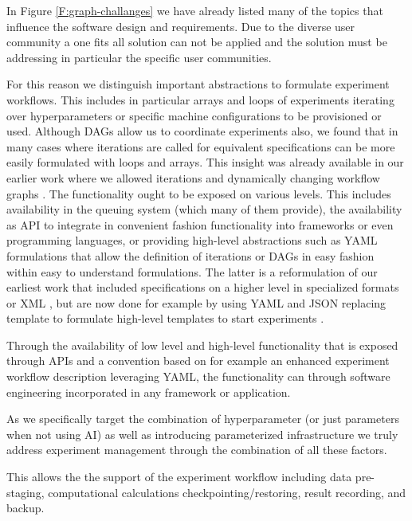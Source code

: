 \documentclass[utf8]{FrontiersinVancouver} %
\begin{document}
In Figure \ref{F:graph-challanges} we have already listed many of the topics that influence the software design and requirements. Due to the diverse user community a one fits all solution can not be applied and the solution must be addressing in particular the specific user communities.

For this reason we distinguish important abstractions to formulate experiment workflows. This includes in particular arrays and loops of experiments iterating over hyperparameters or specific machine configurations to be provisioned or used. 
Although DAGs allow us to coordinate experiments also, we found that in many cases where iterations are called for equivalent specifications can be more easily formulated with loops and arrays. This insight was already available in our earlier work where we allowed iterations and dynamically changing workflow graphs \citep{las07-workflow}. The functionality ought to be exposed on various levels. This includes availability in the queuing system (which many of them provide), the availability as API to integrate in convenient fashion functionality into frameworks or even programming languages, or providing high-level abstractions such as YAML formulations that allow the definition of iterations or DAGs in easy fashion within easy to understand formulations. The latter is a reformulation of our earliest work that included specifications on a higher level in specialized formats \citep{las-96-ecwmf}  or XML \citep{las07-workflow}, but are now done for example by using YAML and JSON replacing template to formulate high-level templates to start experiments \citep{cloudmesh-cc,cloudmask-ee}.

Through the availability of low level and high-level functionality that is exposed through APIs and a convention based on for example an enhanced experiment workflow description leveraging YAML, the functionality can through software engineering incorporated in any framework or application. 

As we specifically target the combination of hyperparameter (or just parameters when not using AI) as well as introducing parameterized infrastructure we truly address experiment management through the combination of all these factors.

This allows the the support of the experiment workflow including data pre-staging, computational calculations
checkpointing/restoring, result recording, and backup.
\end{document}
